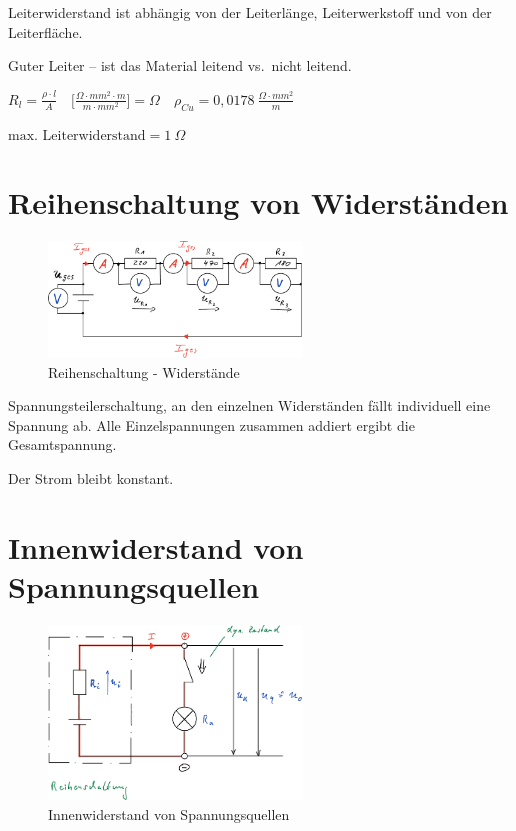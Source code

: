 Leiterwiderstand ist abhängig von der Leiterlänge, Leiterwerkstoff und
von der Leiterfläche.

Guter Leiter -- ist das Material leitend vs.~nicht leitend.

$\boxed{R_l = \frac{\rho \cdot l}{A}} \quad \bigl[\frac{\Omega \cdot mm^2 \cdot m}{m \cdot mm^2}\bigl] = \Omega \quad \rho_{Cu} = 0,0178~\frac{\Omega \cdot mm^2}{m}$

$\boxed{\text{max. Leiterwiderstand} = 1~\Omega}$

\newpage

\section{Reihenschaltung von
Widerständen}\label{reihenschaltung-von-widerstaenden}

\begin{figure}[!ht]%
\centering
\includegraphics[width=0.6\textwidth]{images/Skizze/07_Reihenschaltung_Widerstaende_Skizze.pdf}
\caption{Reihenschaltung - Widerstände}
\end{figure}

Spannungsteilerschaltung, an den einzelnen Widerständen fällt
individuell eine Spannung ab. Alle Einzelspannungen zusammen addiert
ergibt die Gesamtspannung.

Der Strom bleibt konstant.

\newpage

\section{Innenwiderstand von
Spannungsquellen}\label{innenwiderstand-von-spannungsquellen}

\begin{figure}[!ht]%
\centering
\includegraphics[width=0.6\textwidth]{images/Skizze/14_ Innenwiderstand_von_Spannungsquellen_Skizze.pdf}
\caption{Innenwiderstand von Spannungsquellen}
\end{figure}

